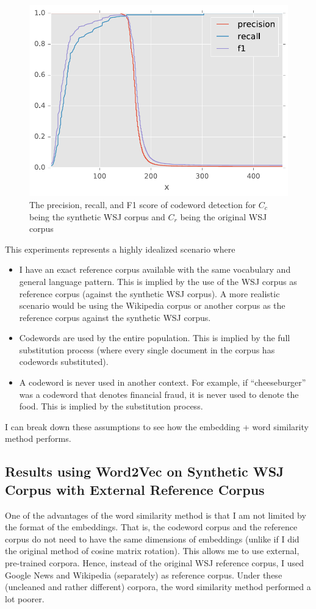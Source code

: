 \begin{figure}[h]
\centering
\includegraphics[width=.5\textwidth]{figures/wsj-f1.pdf}
\caption{The precision, recall, and F1 score of codeword detection for $C_c$ being the synthetic WSJ corpus and $C_r$ being the original WSJ corpus}
\label{fig-wsj-f1}
\end{figure}

This experiments represents a highly idealized scenario where

\begin{itemize}
\item I have an exact reference corpus available with the same vocabulary and general language pattern. This is implied by the use of the WSJ corpus as reference corpus (against the synthetic WSJ corpus). A more realistic scenario would be using the Wikipedia corpus or another corpus as the reference corpus against the synthetic WSJ corpus.
\item Codewords are used by the entire population. This is implied by the full substitution process (where every single document in the corpus has codewords substituted).
\item A codeword is never used in another context. For example, if ``cheeseburger'' was a codeword that denotes financial fraud, it is never used to denote the food. This is implied by the substitution process.
\end{itemize}

I can break down these assumptions to see how the embedding + word similarity method performs.

\subsection{Results using Word2Vec on Synthetic WSJ Corpus with External Reference Corpus}

One of the advantages of the word similarity method is that I am not limited by the format of the embeddings. That is, the codeword corpus and the reference corpus do not need to have the same dimensions of embeddings (unlike if I did the original method of cosine matrix rotation). This allows me to use external, pre-trained corpora. Hence, instead of the original WSJ reference corpus, I used Google News and Wikipedia (separately) as reference corpus. Under these (uncleaned and rather different) corpora, the word similarity method performed a lot poorer.

